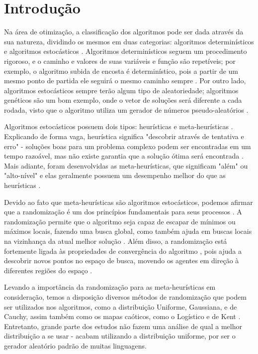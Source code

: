 \chapter{Introdução}
\label{cap:introducao}

Na área de otimização, a classificação dos algoritmos pode ser dada através da sua natureza, dividindo os mesmos em duas categorias: algoritmos determinísticos e algoritmos estocásticos \cite{yang}. Algoritmos determinísticos seguem um procedimento rigoroso, e o caminho e valores de suas variáveis e função são repetíveis; por exemplo, o algoritmo subida de encosta é determinístico, pois a partir de um mesmo ponto de partida ele seguirá o mesmo caminho sempre \cite{yang}. Por outro lado, algoritmos estocásticos sempre terão algum tipo de aleatoriedade; algoritmos genéticos são um bom exemplo, onde o vetor de soluções será diferente a cada rodada, visto que o algoritmo utiliza um gerador de números pseudo-aleatórios \cite{yang}.

Algoritmos estocásticos possuem dois tipos: heurísticas e meta-heurísticas \cite{yang}. Explicando de forma vaga, heurística significa "descobrir através de tentativa e erro" - soluções boas para um problema complexo podem ser encontradas em um tempo razoável, mas não existe garantia que a solução ótima será encontrada \cite{yang}. Mais adiante, foram desenvolvidas as meta-heurísticas, que significam "além" ou "alto-nível" e elas geralmente possuem um desempenho melhor do que as heurísticas \cite{yang}.

Devido ao fato que meta-heurísticas são algoritmos estocásticos, podemos afirmar que a randomização é um dos princípios fundamentais para seus processos \cite{yang2}. A randomização permite que o algoritmo seja capaz de escapar de mínimos ou máximos locais, fazendo uma busca global, como também ajuda em buscas locais na vizinhança da atual melhor solução \cite{yang2}. Além disso, a randomização está fortemente ligada às propriedades de convergência do algoritmo \cite{caponetto}, pois ajuda a descobrir novos pontos no espaço de busca, movendo os agentes em direção à diferentes regiões do espaço \cite{fister}.

Levando a importância da randomização para as meta-heurísticas em consideração, temos a disposição diversos métodos de randomização que podem ser utilizados nos algoritmos, como a distribuição Uniforme, Gaussiana, e de Cauchy, assim também como os mapas caóticos, como o Logístico e de Kent \cite{fister}. Entretanto, grande parte dos estudos não fazem uma análise de qual a melhor distribuição a se usar - acabam utilizando a distribuição uniforme, por ser o gerador aleatório padrão de muitas linguagens.

